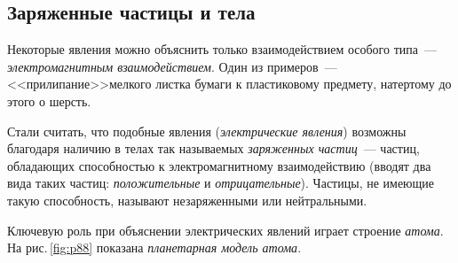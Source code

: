\documentclass[main.tex]{subfiles}
\begin{document}

\pagestyle{empty}

\begin{NoHyper} %

\setcounter{section}{1
}
\addtocounter{section}{-1} 

\section{Заряженные частицы и тела}


Некоторые явления можно объяснить только взаимодействием особого типа~--- \emph{электромагнитным взаимодействием}. Один из примеров~--- <<прилипание>>\linebreak мелкого листка бумаги к пластиковому предмету, натертому до этого о шерсть.

Стали считать, что подобные явления (\emph{электрические явления}) возможны благодаря наличию в телах так называемых \emph{заряженных частиц}~--- частиц, обладающих способностью к электромагнитному взаимодействию (вводят два вида таких частиц: \emph{положительные} и \emph{отрицательные}). Частицы, не имеющие такую способность, называют незаряженными или нейтральными. 

Ключевую роль при объяснении электрических явлений играет строение \emph{атома}. На рис.\,\ref{fig:p88} показана \emph{планетарная модель атома}.

\begin{figure}[H]
    \centering

\end{figure}
\end{NoHyper}
\end{document}
